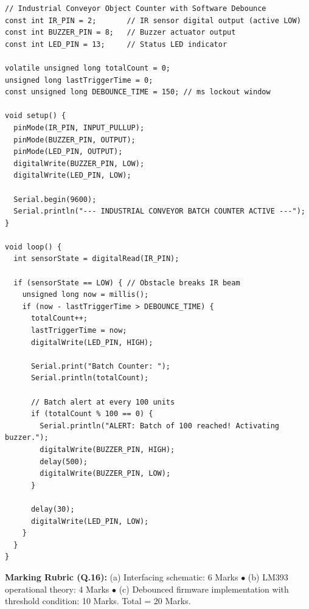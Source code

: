 \begin{solutionbox}
\begin{verbatim}
// Industrial Conveyor Object Counter with Software Debounce
const int IR_PIN = 2;       // IR sensor digital output (active LOW)
const int BUZZER_PIN = 8;   // Buzzer actuator output
const int LED_PIN = 13;     // Status LED indicator

volatile unsigned long totalCount = 0;
unsigned long lastTriggerTime = 0;
const unsigned long DEBOUNCE_TIME = 150; // ms lockout window

void setup() {
  pinMode(IR_PIN, INPUT_PULLUP);
  pinMode(BUZZER_PIN, OUTPUT);
  pinMode(LED_PIN, OUTPUT);
  digitalWrite(BUZZER_PIN, LOW);
  digitalWrite(LED_PIN, LOW);
  
  Serial.begin(9600);
  Serial.println("--- INDUSTRIAL CONVEYOR BATCH COUNTER ACTIVE ---");
}

void loop() {
  int sensorState = digitalRead(IR_PIN);
  
  if (sensorState == LOW) { // Obstacle breaks IR beam
    unsigned long now = millis();
    if (now - lastTriggerTime > DEBOUNCE_TIME) {
      totalCount++;
      lastTriggerTime = now;
      digitalWrite(LED_PIN, HIGH);
      
      Serial.print("Batch Counter: ");
      Serial.println(totalCount);
      
      // Batch alert at every 100 units
      if (totalCount % 100 == 0) {
        Serial.println("ALERT: Batch of 100 reached! Activating buzzer.");
        digitalWrite(BUZZER_PIN, HIGH);
        delay(500);
        digitalWrite(BUZZER_PIN, LOW);
      }
      
      delay(30);
      digitalWrite(LED_PIN, LOW);
    }
  }
}
\end{verbatim}
\end{solutionbox}
\begin{markingrubric}
\textbf{Marking Rubric (Q.16):} (a) Interfacing schematic: 6 Marks $\bullet$ (b) LM393 operational theory: 4 Marks $\bullet$ (c) Debounced firmware implementation with threshold condition: 10 Marks. Total = 20 Marks.
\end{markingrubric}
\newpage
